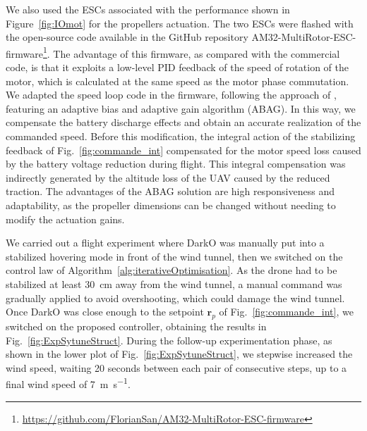 We also used the ESCs associated with the performance shown in Figure~\ref{fig:IOmot} for the propellers actuation. The two ESCs were flashed with the open-source code available in the GitHub repository AM32-MultiRotor-ESC-firmware\footnote{\url{https://github.com/FlorianSan/AM32-MultiRotor-ESC-firmware}}. The advantage of this firmware, as compared with the commercial code, is that it exploits a low-level PID feedback of the speed of rotation of the motor, which is calculated at the same speed as the motor phase commutation. We adapted the speed loop code in the firmware, following the approach of \cite{franchi:hal-01476812}, featuring an adaptive bias and adaptive gain algorithm (ABAG). In this way, we compensate the battery discharge effects and obtain an accurate realization of the commanded speed. Before this modification, the integral action of the stabilizing feedback of Fig.~\ref{fig:commande_int} compensated for the motor speed loss caused by the battery voltage reduction during flight. This integral compensation was indirectly generated by the altitude loss of the UAV caused by the reduced traction. The advantages of the ABAG solution are high responsiveness and adaptability, as the propeller dimensions can be changed without needing to modify the actuation gains.

We carried out a flight experiment where DarkO was manually put into a stabilized hovering mode in front of the wind tunnel, then we switched on the control law of Algorithm~\ref{alg:iterativeOptimisation}. As the drone had to be stabilized at least \SI{30}{\centi\meter} away from the wind tunnel, a manual command was gradually applied to avoid overshooting, which could damage the wind tunnel. Once DarkO was close enough to the setpoint $\boldsymbol{r}_{p}$ of Fig.~\ref{fig:commande_int}, we switched on the proposed controller, obtaining the results in Fig.~\ref{fig:ExpSytuneStruct}. During the follow-up experimentation phase, as shown in the lower plot of Fig.~\ref{fig:ExpSytuneStruct}, we stepwise increased the wind speed, waiting 20 seconds between each  pair of consecutive steps, up to a final wind speed of \SI{7}{\meter\per\second}.


